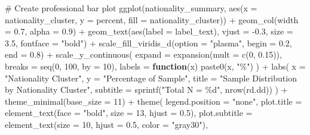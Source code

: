 \documentclass[
  12pt,
  letterpaper,
  DIV=11,
  numbers=noendperiod]{scrartcl}
\newenvironment{Shaded}{\begin{snugshade}}{\end{snugshade}}
\newcommand{\AttributeTok}[1]{\textcolor[rgb]{0.40,0.45,0.13}{#1}}
\newcommand{\CommentTok}[1]{\textcolor[rgb]{0.37,0.37,0.37}{#1}}
\newcommand{\ControlFlowTok}[1]{\textcolor[rgb]{0.00,0.23,0.31}{\textbf{#1}}}
\newcommand{\DecValTok}[1]{\textcolor[rgb]{0.68,0.00,0.00}{#1}}
\newcommand{\FloatTok}[1]{\textcolor[rgb]{0.68,0.00,0.00}{#1}}
\newcommand{\FunctionTok}[1]{\textcolor[rgb]{0.28,0.35,0.67}{#1}}
\newcommand{\NormalTok}[1]{\textcolor[rgb]{0.00,0.23,0.31}{#1}}
\newcommand{\SpecialCharTok}[1]{\textcolor[rgb]{0.37,0.37,0.37}{#1}}
\newcommand{\StringTok}[1]{\textcolor[rgb]{0.13,0.47,0.30}{#1}}
\theoremstyle{plain}
\theoremstyle{definition}
\begin{document}
{\begin{Shaded}
\begin{Highlighting}[]
\CommentTok{\# Create professional bar plot}
\FunctionTok{ggplot}\NormalTok{(nationality\_summary, }\FunctionTok{aes}\NormalTok{(}\AttributeTok{x =}\NormalTok{ nationality\_cluster, }\AttributeTok{y =}\NormalTok{ percent, }\AttributeTok{fill =}\NormalTok{ nationality\_cluster)) }\SpecialCharTok{+}
  \FunctionTok{geom\_col}\NormalTok{(}\AttributeTok{width =} \FloatTok{0.7}\NormalTok{, }\AttributeTok{alpha =} \FloatTok{0.9}\NormalTok{) }\SpecialCharTok{+}
  \FunctionTok{geom\_text}\NormalTok{(}\FunctionTok{aes}\NormalTok{(}\AttributeTok{label =}\NormalTok{ label\_text),}
            \AttributeTok{vjust =} \SpecialCharTok{{-}}\FloatTok{0.3}\NormalTok{,}
            \AttributeTok{size =} \FloatTok{3.5}\NormalTok{,}
            \AttributeTok{fontface =} \StringTok{"bold"}\NormalTok{) }\SpecialCharTok{+}
  \FunctionTok{scale\_fill\_viridis\_d}\NormalTok{(}\AttributeTok{option =} \StringTok{"plasma"}\NormalTok{, }\AttributeTok{begin =} \FloatTok{0.2}\NormalTok{, }\AttributeTok{end =} \FloatTok{0.8}\NormalTok{) }\SpecialCharTok{+}
  \FunctionTok{scale\_y\_continuous}\NormalTok{(}
    \AttributeTok{expand =} \FunctionTok{expansion}\NormalTok{(}\AttributeTok{mult =} \FunctionTok{c}\NormalTok{(}\DecValTok{0}\NormalTok{, }\FloatTok{0.15}\NormalTok{)),}
    \AttributeTok{breaks =} \FunctionTok{seq}\NormalTok{(}\DecValTok{0}\NormalTok{, }\DecValTok{100}\NormalTok{, }\AttributeTok{by =} \DecValTok{10}\NormalTok{),}
    \AttributeTok{labels =} \ControlFlowTok{function}\NormalTok{(x) }\FunctionTok{paste0}\NormalTok{(x, }\StringTok{"\%"}\NormalTok{)}
\NormalTok{  ) }\SpecialCharTok{+}
  \FunctionTok{labs}\NormalTok{(}
    \AttributeTok{x =} \StringTok{"Nationality Cluster"}\NormalTok{,}
    \AttributeTok{y =} \StringTok{"Percentage of Sample"}\NormalTok{,}
    \AttributeTok{title =} \StringTok{"Sample Distribution by Nationality Cluster"}\NormalTok{,}
    \AttributeTok{subtitle =} \FunctionTok{sprintf}\NormalTok{(}\StringTok{"Total N = \%d"}\NormalTok{, }\FunctionTok{nrow}\NormalTok{(rd.dd))}
\NormalTok{  ) }\SpecialCharTok{+}
  \FunctionTok{theme\_minimal}\NormalTok{(}\AttributeTok{base\_size =} \DecValTok{11}\NormalTok{) }\SpecialCharTok{+}
  \FunctionTok{theme}\NormalTok{(}
    \AttributeTok{legend.position =} \StringTok{"none"}\NormalTok{,}
    \AttributeTok{plot.title =} \FunctionTok{element\_text}\NormalTok{(}\AttributeTok{face =} \StringTok{"bold"}\NormalTok{, }\AttributeTok{size =} \DecValTok{13}\NormalTok{, }\AttributeTok{hjust =} \FloatTok{0.5}\NormalTok{),}
    \AttributeTok{plot.subtitle =} \FunctionTok{element\_text}\NormalTok{(}\AttributeTok{size =} \DecValTok{10}\NormalTok{, }\AttributeTok{hjust =} \FloatTok{0.5}\NormalTok{, }\AttributeTok{color =} \StringTok{"gray30"}\NormalTok{),}

\end{Highlighting}
\end{Shaded}}
\end{document}

